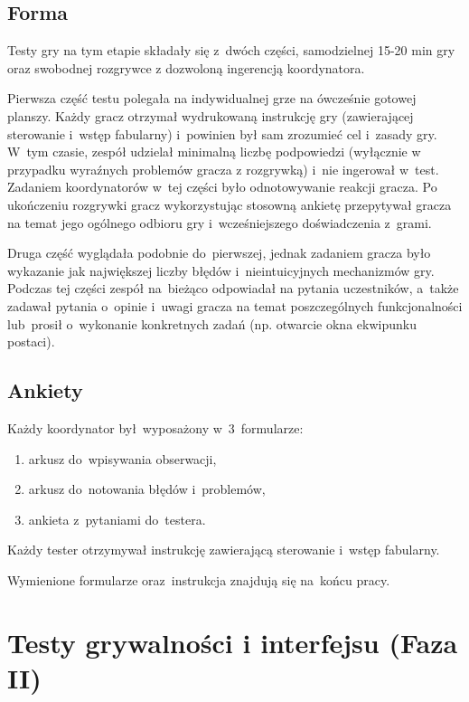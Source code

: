 \documentclass[licencjacka]{pracamgr}
\begin{document}
      \subsection{Forma}
      Testy gry na tym etapie składały się z~dwóch części, samodzielnej 15-20 min gry
      oraz swobodnej rozgrywce z dozwoloną ingerencją koordynatora.

      Pierwsza część testu polegała na indywidualnej grze na ówcześnie gotowej planszy.
      Każdy gracz otrzymał wydrukowaną instrukcję gry (zawierającej sterowanie i~wstęp fabularny)
      i~powinien był sam zrozumieć cel i~zasady gry. W~tym czasie, zespół udzielał minimalną liczbę
      podpowiedzi (wyłącznie w przypadku wyraźnych problemów gracza z rozgrywką) i~nie ingerował w~test.
      Zadaniem koordynatorów w~tej części było odnotowywanie reakcji gracza.
      Po ukończeniu rozgrywki gracz wykorzystując stosowną ankietę przepytywał gracza na temat
      jego ogólnego odbioru gry i~wcześniejszego doświadczenia z~grami.

      Druga część wyglądała podobnie do~pierwszej, jednak zadaniem gracza było wykazanie
      jak największej liczby błędów i~nieintuicyjnych mechanizmów gry.
      Podczas tej części zespół na~bieżąco odpowiadał na pytania uczestników,
      a~także zadawał pytania o~opinie i~uwagi gracza na temat poszczególnych funkcjonalności
      lub~prosił o~wykonanie konkretnych zadań (np. otwarcie okna ekwipunku postaci).

      \subsection{Ankiety}
      Każdy koordynator był~wyposażony w~3~formularze:
      \begin{enumerate}
	\item arkusz do~wpisywania obserwacji,
	\item arkusz do~notowania błędów i~problemów,
	\item ankieta z~pytaniami do~testera.
      \end{enumerate}
      Każdy tester otrzymywał instrukcję zawierającą sterowanie i~wstęp fabularny.

      \noindent
      Wymienione formularze oraz~instrukcja znajdują się na~końcu pracy.

    \section{Testy grywalności i interfejsu (Faza II)}
\end{document}
